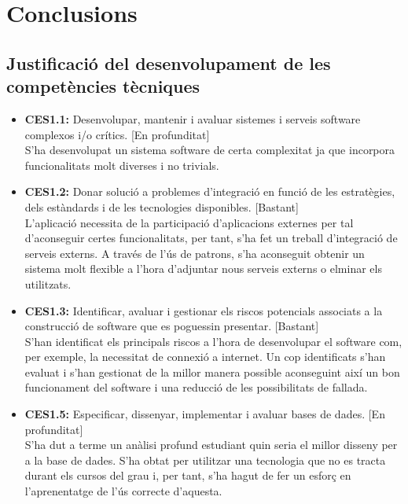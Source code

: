 
\chapter{Conclusions} %

\label{Conclusions} %

\section{Justificació del desenvolupament de les competències tècniques}

\begin{itemize}
\item{}\textbf{CES1.1:} Desenvolupar, mantenir i avaluar sistemes i serveis software complexos i/o crítics. [En profunditat]\\
S’ha desenvolupat un sistema software de certa complexitat ja que incorpora funcionalitats molt diverses i no trivials.
\item{}\textbf{CES1.2:} Donar solució a problemes d’integració en funció de les estratègies, dels estàndards i de les tecnologies disponibles. [Bastant]\\
L’aplicació necessita de la participació d’aplicacions externes per tal d’aconseguir certes funcionalitats, per tant, s’ha fet un treball d’integració de
serveis externs. A través de l’ús de patrons, s’ha aconseguit obtenir un
sistema molt flexible a l’hora d’adjuntar nous serveis externs o elminar
els utilitzats.
\item{}\textbf{CES1.3:} Identificar, avaluar i gestionar els riscos potencials associats a la
construcció de software que es poguessin presentar. [Bastant]\\
S’han identificat els principals riscos a l’hora de desenvolupar el software
com, per exemple, la necessitat de connexió a internet. Un cop identificats
s’han evaluat i s’han gestionat de la millor manera possible aconseguint
així un bon funcionament del software i una reducció de les possibilitats
de fallada.
\item{}\textbf{CES1.5:} Especificar, dissenyar, implementar i avaluar bases de dades. [En profunditat]\\
S’ha dut a terme un anàlisi profund estudiant quin seria el millor disseny
per a la base de dades. S’ha obtat per utilitzar una tecnologia que no es
tracta durant els cursos del grau i, per tant, s’ha hagut de fer un esforç en l’aprenentatge de l’ús correcte d’aquesta.

\end{itemize}

